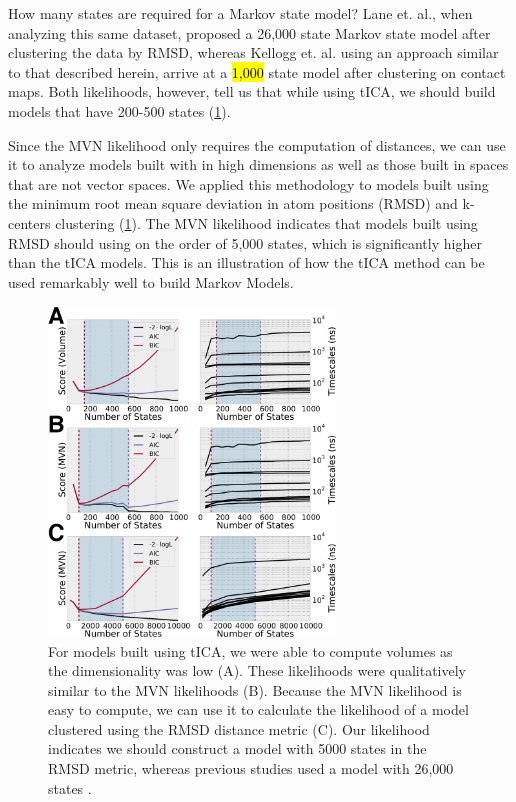 \documentclass[twocolumn,floatfix,nofootinbib,aps]{revtex4-1}
\begin{document}
How many states are required for a Markov state model? Lane et. al., when analyzing this same dataset, proposed a 26,000 state Markov state model after clustering the data by RMSD, whereas Kellogg et. al. using an approach similar to that described herein, arrive at a \hl{1,000} state model after clustering on contact maps\cite{Lane2011Markov, Kellogg2012Evaluation}. Both likelihoods, however, tell us that while using tICA, we should build models that have 200-500 states (\cref{fig:ww}). 

Since the MVN likelihood only requires the computation of distances, we can use it to analyze models built with in high dimensions as well as those built in spaces that are not vector spaces. We applied this methodology to models built using the minimum root mean square deviation in atom positions (RMSD) and k-centers clustering (\cref{fig:ww}). The MVN likelihood indicates that models built using RMSD should using on the order of 5,000 states, which is significantly higher than the tICA models. This is an illustration of how the tICA method can be used remarkably well to build Markov Models.

\begin{figure}
\centering
\includegraphics[width=3in]{figs/ww_logLs.png}
\caption{For models built using tICA, we were able to compute volumes as the dimensionality was low (A). These likelihoods were qualitatively similar to the MVN likelihoods (B). Because the MVN likelihood is easy to compute, we can use it to calculate the likelihood of a model clustered using the RMSD distance metric (C). Our likelihood indicates we should construct a model with 5000 states in the RMSD metric, whereas previous studies used a model with 26,000 states \cite{Lane2011Markov}.}
\label{fig:ww}
\end{figure}
\end{document}

